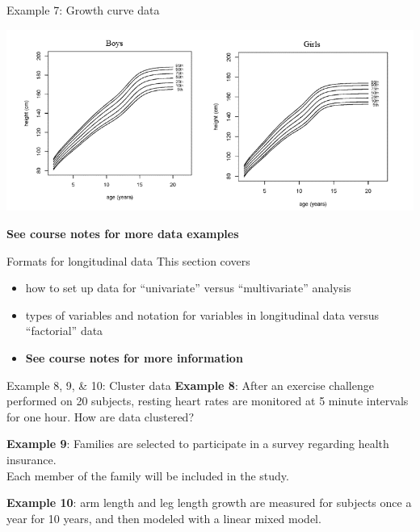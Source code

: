 \documentclass[
  9pt,
  ignorenonframetext,
]{beamer}
\begin{document}
\begin{frame}{}
\protect\hypertarget{section-7}{}
\begin{block}{Example 7: Growth curve data}
\protect\hypertarget{example-7-growth-curve-data-1}{}
\begin{center}\includegraphics[width=1\linewidth]{figs_L1/L1-f2} \end{center}

\textbf{See course notes for more data examples}
\end{block}
\end{frame}

\begin{frame}{Formats for longitudinal data}
\protect\hypertarget{formats-for-longitudinal-data}{}
This section covers

\begin{itemize}
\item
  how to set up data for ``univariate'' versus ``multivariate'' analysis
\item
  types of variables and notation for variables in longitudinal data
  versus ``factorial'' data
\item
  \textbf{See course notes for more information}
\end{itemize}
\end{frame}

\begin{frame}{}
\protect\hypertarget{section-8}{}
\begin{block}{Example 8, 9, \& 10: Cluster data}
\protect\hypertarget{example-8-9-10-cluster-data}{}
\textbf{Example 8}: After an exercise challenge performed on 20
subjects, resting heart rates are monitored at 5 minute intervals for
one hour. How are data clustered?

\textbf{Example 9}: Families are selected to participate in a survey
regarding health insurance.\\
Each member of the family will be included in the study.

\textbf{Example 10}: arm length and leg length growth are measured for
subjects once a year for 10 years, and then modeled with a linear mixed
model.
\end{block}
\end{frame}
\end{document}
